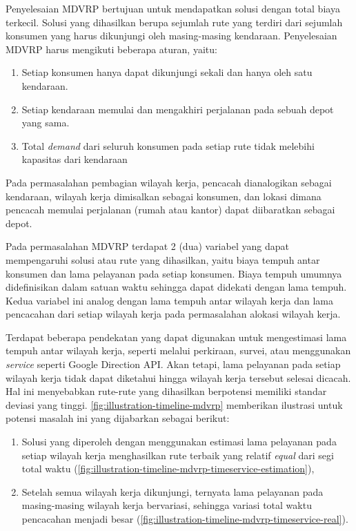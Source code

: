 Penyelesaian MDVRP bertujuan untuk mendapatkan solusi dengan total biaya terkecil. Solusi yang dihasilkan berupa sejumlah rute yang terdiri dari sejumlah konsumen yang harus dikunjungi oleh masing-masing kendaraan. Penyelesaian MDVRP harus mengikuti beberapa aturan, yaitu:

\begin{enumerate}
	\item Setiap konsumen hanya dapat dikunjungi sekali dan hanya oleh satu kendaraan. 
	\item Setiap kendaraan memulai dan mengakhiri perjalanan pada sebuah depot yang sama. 
	\item Total \textit{demand} dari seluruh konsumen pada setiap rute tidak melebihi kapasitas dari kendaraan 
\end{enumerate}


Pada permasalahan pembagian wilayah kerja, pencacah dianalogikan sebagai kendaraan, wilayah kerja dimisalkan sebagai konsumen, dan lokasi dimana pencacah memulai perjalanan (rumah atau kantor) dapat diibaratkan sebagai depot.


Pada permasalahan MDVRP terdapat 2 (dua) variabel yang dapat mempengaruhi solusi atau rute yang dihasilkan, yaitu biaya tempuh antar konsumen dan lama pelayanan pada setiap konsumen. Biaya tempuh umumnya didefinisikan dalam satuan waktu sehingga dapat didekati dengan lama tempuh. Kedua variabel ini analog dengan lama tempuh antar wilayah kerja dan lama pencacahan dari setiap wilayah kerja pada permasalahan alokasi wilayah kerja. 


Terdapat beberapa pendekatan yang dapat digunakan untuk mengestimasi lama tempuh antar wilayah kerja, seperti melalui perkiraan, survei, atau menggunakan \textit{service} seperti Google Direction API. Akan tetapi, lama pelayanan pada setiap wilayah kerja tidak dapat diketahui hingga wilayah kerja tersebut selesai dicacah. Hal ini menyebabkan rute-rute yang dihasilkan berpotensi memiliki standar deviasi yang tinggi. \autoref{fig:illustration-timeline-mdvrp} memberikan ilustrasi untuk potensi masalah ini yang dijabarkan sebagai berikut:

\begin{enumerate}
	\item Solusi yang diperoleh dengan menggunakan estimasi lama pelayanan pada setiap wilayah kerja menghasilkan rute terbaik yang relatif \textit{equal} dari segi total waktu (\autoref{fig:illustration-timeline-mdvrp-timeservice-estimation}), 
	\item Setelah semua wilayah kerja dikunjungi, ternyata lama pelayanan pada masing-masing wilayah kerja bervariasi, sehingga variasi total waktu pencacahan menjadi besar (\autoref{fig:illustration-timeline-mdvrp-timeservice-real}).
\end{enumerate}


